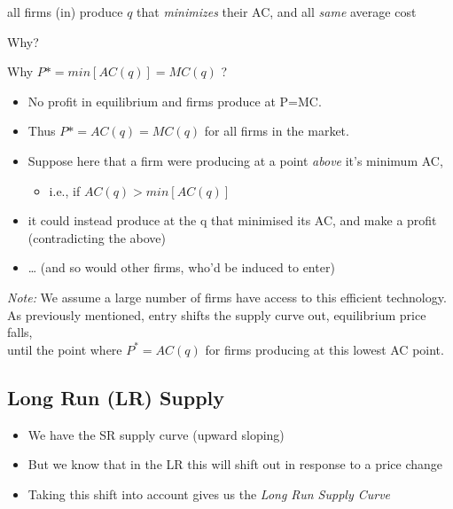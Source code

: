 \documentclass[]{article}
\providecommand{\tightlist}{%
  \setlength{\itemsep}{0pt}\setlength{\parskip}{0pt}}
\begin{document}
all firms (in) produce \(q\) that \emph{minimizes} their AC, and all
\emph{same} average cost

Why?

Why \(P* = min [AC(q)] = MC(q)\) ?

\begin{itemize}
\item
  No profit in equilibrium and firms produce at P=MC.
\item
  Thus \(P*=AC(q)=MC(q)\) for all firms in the market.
\end{itemize}

\bigskip

\begin{itemize}
\item
  Suppose here that a firm were producing at a point \emph{above} it's
  minimum AC,

  \begin{itemize}
  \tightlist
  \item
    i.e., if \(AC(q)> min [AC(q)]\)
  \end{itemize}
\item
  it could instead produce at the q that minimised its AC, and make a
  profit (contradicting the above)
\item
  \ldots{} (and so would other firms, who'd be induced to enter)
\end{itemize}

\emph{Note:} We assume a large number of firms have access to this
efficient technology.\\
As previously mentioned, entry shifts the supply curve out, equilibrium
price falls,\\
until the point where \(P^*=AC(q)\) for firms producing at this lowest
AC point.

\hypertarget{long-run-lr-supply}{%
\subsection{Long Run (LR) Supply}\label{long-run-lr-supply}}

\begin{itemize}
\tightlist
\item
  We have the SR supply curve (upward sloping)
\item
  But we know that in the LR this will shift out in response to a price
  change
\item
  Taking this shift into account gives us the \emph{Long Run Supply
  Curve}
\end{itemize}
\end{document}
